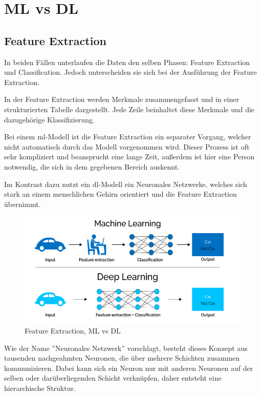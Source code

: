 \section{ML vs DL}

\subsection{Feature Extraction}

In beiden Fällen unterlaufen die Daten den selben Phasen: Feature Extraction und Classification. Jedoch unterscheiden sie sich bei der Ausführung der Feature Extraction. 

In der Feature Extraction werden Merkmale zusammengefasst und in einer strukturierten Tabelle dargestellt. Jede Zeile beinhaltet diese Merkmale und die dazugehörige Klassifizierung.

Bei einem \gls{ml}-Modell ist die Feature Extraction ein separater Vorgang, welcher nicht automatisch durch das Modell vorgenommen wird. Dieser Prozess ist oft sehr kompliziert und beansprucht eine lange Zeit, außerdem ist hier eine Person notwendig, die sich in dem gegebenen Bereich auskennt.

Im Kontrast dazu nutzt ein \gls{dl}-Modell ein Neuronales Netzwerke, welches sich stark an einem menschlichen Gehirn orientiert und die Feature Extraction übernimmt.

\begin{figure}[h]
    \centering
    \includegraphics[scale=0.6]{sections/machine-learning/images/MLvsDL.png}
    \caption{Feature Extraction, ML vs DL}
\end{figure}

Wie der Name ''Neuronales Netzwerk'' vorschlagt, besteht dieses Konzept aus tausenden nachgeahmten Neuronen, die über mehrere Schichten zusammen kommunizieren. Dabei kann sich ein Neuron nur mit anderen Neuronen auf der selben oder darüberliegenden Schicht verknüpfen, daher entsteht eine hierarchische Struktur. 

